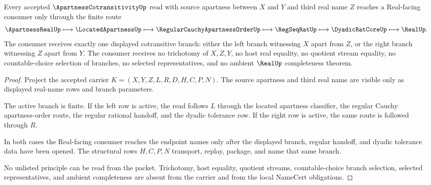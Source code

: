 \begin{theorem}
\label{thm:apartness-cotransitivity-real-boundary}
Every accepted $\ApartnessCotransitivityUp$ read with source apartness between $X$ and $Y$ and third real name $Z$ reaches a Real-facing consumer only through the finite route
$$
\ApartnessRealUp \longmapsto \LocatedApartnessUp \longmapsto \RegularCauchyApartnessOrderUp \longmapsto \RegSeqRatUp \longmapsto \DyadicRatCoreUp \longmapsto \RealUp .
$$
The consumer receives exactly one displayed cotransitive branch: either the left branch witnessing $X$ apart from $Z$, or the right branch witnessing $Z$ apart from $Y$. The consumer receives no trichotomy of $X,Z,Y$, no host real equality, no quotient stream equality, no countable-choice selection of branches, no selected representatives, and no ambient $\RealUp$ completeness theorem.
\end{theorem}
\begin{proof}
Project the accepted carrier $K=(X,Y,Z,L,R,D,H,C,P,N)$. The source apartness and third real name are visible only as displayed real-name rows and branch parameters.

The active branch is finite. If the left row is active, the read follows $L$ through the located apartness classifier, the regular Cauchy apartness-order route, the regular rational handoff, and the dyadic tolerance row. If the right row is active, the same route is followed through $R$.

In both cases the Real-facing consumer reaches the endpoint names only after the displayed branch, regular handoff, and dyadic tolerance data have been opened. The structural rows $H,C,P,N$ transport, replay, package, and name that same branch.

No unlisted principle can be read from the packet. Trichotomy, host equality, quotient streams, countable-choice branch selection, selected representatives, and ambient completeness are absent from the carrier and from the local NameCert obligations.
\end{proof}



